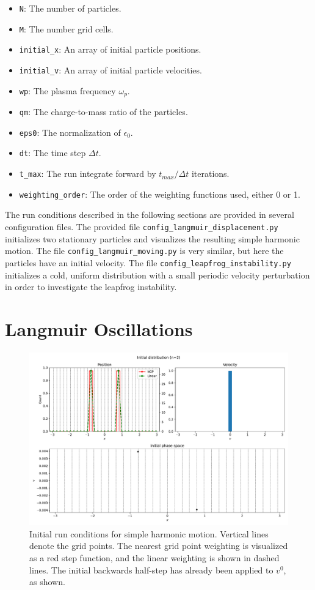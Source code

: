 \documentclass[%
 reprint,
 amsmath,amssymb,
 aps,
]{revtex4-2}
\begin{document}
\begin{itemize}
    \item \texttt{N}: The number of particles.
    \item \texttt{M}: The number grid cells.
    \item \texttt{initial\_x}: An array of initial particle positions.
    \item \texttt{initial\_v}: An array of initial particle velocities.
    \item \texttt{wp}: The plasma frequency $\omega_p$.
    \item \texttt{qm}: The charge-to-mass ratio of the particles.
    \item \texttt{eps0}: The normalization of $\epsilon_0$.
    \item \texttt{dt}: The time step $\Delta t$.
    \item \texttt{t\_max}: The run integrate forward by $t_{max} / \Delta t$ iterations.
    \item \texttt{weighting\_order}: The order of the weighting functions used, either 0 or 1.
\end{itemize}

The run conditions described in the following sections are provided in several configuration files. The provided file \texttt{config\_langmuir\_displacement.py} initializes two stationary particles and visualizes the resulting simple harmonic motion. The file \texttt{config\_langmuir\_moving.py} is very similar, but here the particles have an initial velocity. The file  \texttt{config\_leapfrog\_instability.py} initializes a cold, uniform distribution with a small periodic velocity perturbation in order to investigate the leapfrog instability.

\section{Langmuir Oscillations}

\begin{figure}
\includegraphics[width=0.9\linewidth]{proj2/langmuir_stationary_init.pdf}
\caption{\label{fig:two-particle-stationary}Initial run conditions for simple harmonic motion. Vertical lines denote the grid points. The nearest grid point weighting is visualized as a red step function, and the linear weighting is shown in dashed lines. The initial backwards half-step has already been applied to $v^0$, as shown.}
\end{figure}
\end{document}
